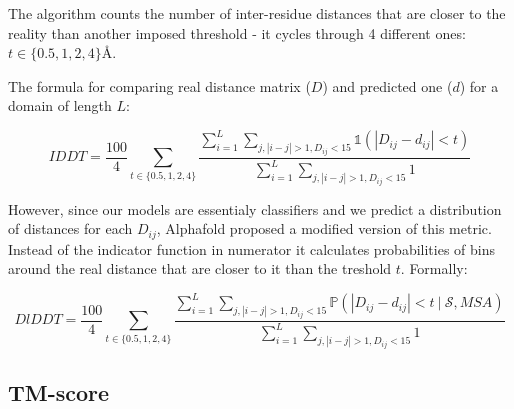 The algorithm counts the number of inter-residue distances that are closer to the reality than another imposed threshold - it cycles through 4 different ones: $t \in \{0.5, 1, 2, 4\}$\AA \cite{lddt}.

The formula for comparing real distance matrix ($D$) and predicted one ($d$) for a domain of length $L$:

$$IDDT = \frac{100}{4} \sum_{t \in \{0.5, 1, 2, 4\}} \frac
{\sum_{i = 1}^L \sum_{j, |i - j| > 1, D_{ij} < 15} \mathds{1}(|D_{ij} - d_{ij}| < t)}
{\sum_{i = 1}^L \sum_{j, |i - j| > 1, D_{ij} < 15} 1} $$

However, since our models are essentialy classifiers and we predict a distribution of distances for each $D_{ij}$, Alphafold proposed a modified version of this metric. Instead of the indicator function in numerator it calculates probabilities of bins around the real distance that are closer to it than the treshold $t$. Formally:

\begin{equation}
DlDDT = \frac{100}{4} \sum_{t \in \{0.5, 1, 2, 4\}} \frac
{\sum_{i = 1}^L \sum_{j, |i - j| > 1, D_{ij} < 15} \mathds{P}(|D_{ij} - d_{ij}| < t~|~ \mathcal{S}, MSA)}
{\sum_{i = 1}^L \sum_{j, |i - j| > 1, D_{ij} < 15} 1}
    \label{eq:dlddt}
\end{equation}

\subsection{TM-score}






